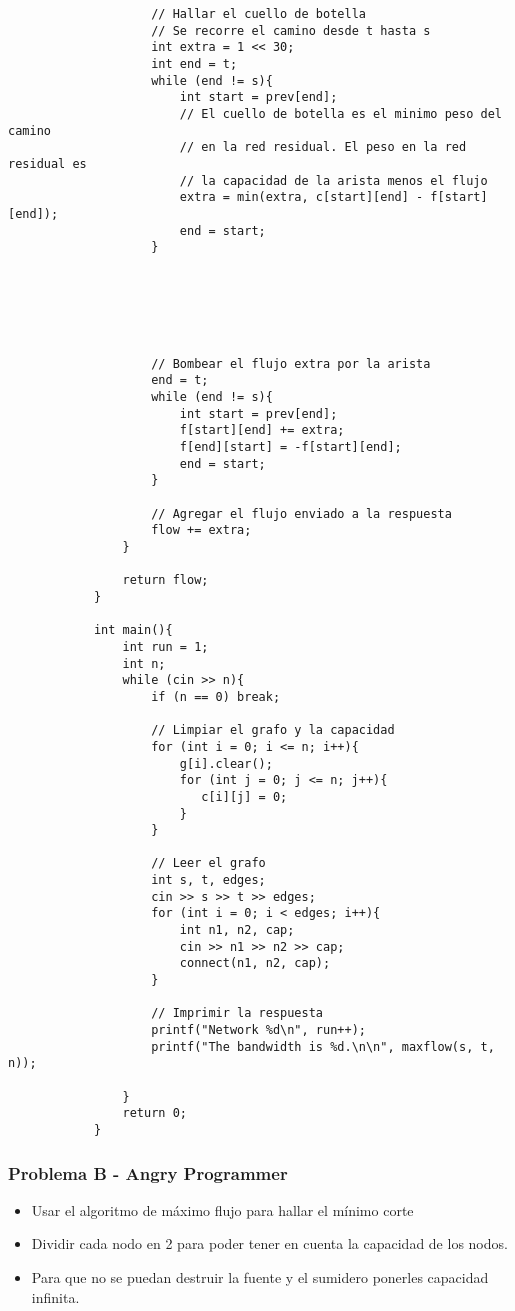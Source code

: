 \documentclass{beamer}
\begin{document}
\begin{frame}
\begin{lstlisting}
			        // Hallar el cuello de botella
			        // Se recorre el camino desde t hasta s
			        int extra = 1 << 30;
			        int end = t;
			        while (end != s){
			            int start = prev[end];
			            // El cuello de botella es el minimo peso del camino 
			            // en la red residual. El peso en la red residual es 
			            // la capacidad de la arista menos el flujo
			            extra = min(extra, c[start][end] - f[start][end]);
			            end = start;
			        }






			        // Bombear el flujo extra por la arista
			        end = t;
			        while (end != s){
			            int start = prev[end];
			            f[start][end] += extra;
			            f[end][start] = -f[start][end];
			            end = start;
			        }

			        // Agregar el flujo enviado a la respuesta
			        flow += extra;
			    }

			    return flow;
			}

			int main(){
			    int run = 1;
			    int n;
			    while (cin >> n){
			        if (n == 0) break;

			        // Limpiar el grafo y la capacidad
			        for (int i = 0; i <= n; i++){
			            g[i].clear();
			            for (int j = 0; j <= n; j++){
			               c[i][j] = 0; 
			            }
			        }

			        // Leer el grafo
			        int s, t, edges;
			        cin >> s >> t >> edges;
			        for (int i = 0; i < edges; i++){
			            int n1, n2, cap;
			            cin >> n1 >> n2 >> cap;
			            connect(n1, n2, cap);
			        }

			        // Imprimir la respuesta
			        printf("Network %d\n", run++);
			        printf("The bandwidth is %d.\n\n", maxflow(s, t, n));

			    }
			    return 0;
			}
		\end{lstlisting}
	\end{frame}
	
	\begin{frame}
		\frametitle{Problema B - Angry Programmer}
		\begin{itemize}
			\item Usar el algoritmo de máximo flujo para hallar el mínimo corte
			\item Dividir cada nodo en 2 para poder tener en cuenta la capacidad de los nodos.
			\item Para que no se puedan destruir la fuente y el sumidero ponerles capacidad infinita.
		\end{itemize}
	\end{frame}
	
\end{document}
